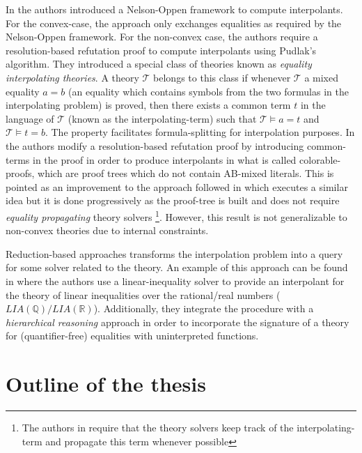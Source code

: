 In \cite{10.1007/11532231_26} the authors introduced a Nelson-Oppen 
framework to compute interpolants. For the convex-case, the approach 
only exchanges equalities as required by the Nelson-Oppen framework. For
the non-convex case, the authors require a resolution-based refutation proof
to compute interpolants using Pudlak's algorithm. They introduced a 
special class of theories known as 
\emph{equality interpolating theories}. 
A theory $\mathcal{T}$ belongs to this class
if whenever $\mathcal{T}$ a mixed equality $a = b$ (an equality
which contains symbols from the two formulas in the interpolating problem)
is proved,
then there exists a common term $t$ in the language of $\mathcal{T}$ 
(known as the interpolating-term) such that 
$\mathcal{T} \models a = t$ and $\mathcal{T} \models t = b$. 
The property facilitates 
formula-splitting for interpolation purposes.
In \cite{10.1007/978-3-642-00768-2_34} the authors modify a 
resolution-based refutation proof by introducing common-terms in 
the proof in order to produce interpolants in what is called
colorable-proofs, which are proof trees which do not contain AB-mixed
literals. This is pointed as an improvement to the approach followed 
in \cite{10.1007/11532231_26} which executes a similar idea but it is done 
progressively as the proof-tree is built and does not require 
\emph{equality propagating} theory solvers
\footnote{The authors in \cite{10.1007/11532231_26} require that 
  the theory solvers keep track of the interpolating-term 
  and propagate this term whenever
possible}. 
However, this result is not generalizable
to non-convex theories due to internal constraints.

Reduction-based approaches transforms the interpolation
problem into a query for some solver related to the theory. 
An example of this approach can be found in \cite{10.1007/978-3-540-69738-1_25}
where the authors use a linear-inequality solver to provide an interpolant
for the theory of linear inequalities over the rational/real numbers 
($LIA(\mathbb{Q})/LIA(\mathbb{R})$). 
Additionally, they integrate the procedure with a 
\emph{hierarchical reasoning} approach in order to incorporate 
the signature of a theory for (quantifier-free) equalities with uninterpreted 
functions.

\section{Outline of the thesis}

